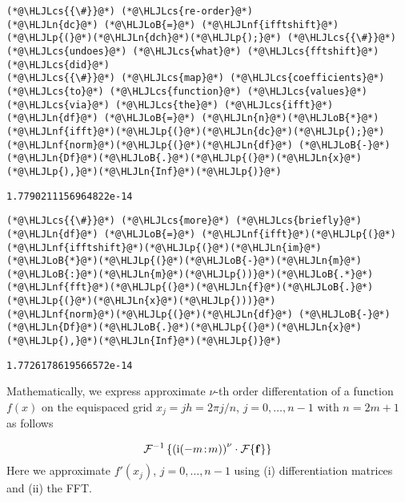 \documentclass[12pt,a4paper]{article}
\newcommand{\HLJLn}[1]{#1}
\newcommand{\HLJLnf}[1]{\textcolor[RGB]{66,102,213}{#1}}
\newcommand{\HLJLoB}[1]{\textcolor[RGB]{102,102,102}{\textbf{#1}}}
\newcommand{\HLJLp}[1]{#1}
\newcommand{\HLJLcs}[1]{\textcolor[RGB]{153,153,119}{\textit{#1}}}
\begin{document}
\begin{lstlisting}
(*@\HLJLcs{{\#}}@*) (*@\HLJLcs{re-order}@*)
(*@\HLJLn{dc}@*) (*@\HLJLoB{=}@*) (*@\HLJLnf{ifftshift}@*)(*@\HLJLp{(}@*)(*@\HLJLn{dch}@*)(*@\HLJLp{);}@*) (*@\HLJLcs{{\#}}@*) (*@\HLJLcs{undoes}@*) (*@\HLJLcs{what}@*) (*@\HLJLcs{fftshift}@*) (*@\HLJLcs{did}@*)
(*@\HLJLcs{{\#}}@*) (*@\HLJLcs{map}@*) (*@\HLJLcs{coefficients}@*) (*@\HLJLcs{to}@*) (*@\HLJLcs{function}@*) (*@\HLJLcs{values}@*) (*@\HLJLcs{via}@*) (*@\HLJLcs{the}@*) (*@\HLJLcs{ifft}@*)
(*@\HLJLn{df}@*) (*@\HLJLoB{=}@*) (*@\HLJLn{n}@*)(*@\HLJLoB{*}@*)(*@\HLJLnf{ifft}@*)(*@\HLJLp{(}@*)(*@\HLJLn{dc}@*)(*@\HLJLp{);}@*)
(*@\HLJLnf{norm}@*)(*@\HLJLp{(}@*)(*@\HLJLn{df}@*) (*@\HLJLoB{-}@*) (*@\HLJLn{Df}@*)(*@\HLJLoB{.}@*)(*@\HLJLp{(}@*)(*@\HLJLn{x}@*)(*@\HLJLp{),}@*)(*@\HLJLn{Inf}@*)(*@\HLJLp{)}@*)
\end{lstlisting}

\begin{lstlisting}
1.7790211156964822e-14
\end{lstlisting}


\begin{lstlisting}
(*@\HLJLcs{{\#}}@*) (*@\HLJLcs{more}@*) (*@\HLJLcs{briefly}@*)
(*@\HLJLn{df}@*) (*@\HLJLoB{=}@*) (*@\HLJLnf{ifft}@*)(*@\HLJLp{(}@*)(*@\HLJLnf{ifftshift}@*)(*@\HLJLp{(}@*)(*@\HLJLn{im}@*)(*@\HLJLoB{*}@*)(*@\HLJLp{(}@*)(*@\HLJLoB{-}@*)(*@\HLJLn{m}@*)(*@\HLJLoB{:}@*)(*@\HLJLn{m}@*)(*@\HLJLp{))}@*)(*@\HLJLoB{.*}@*)(*@\HLJLnf{fft}@*)(*@\HLJLp{(}@*)(*@\HLJLn{f}@*)(*@\HLJLoB{.}@*)(*@\HLJLp{(}@*)(*@\HLJLn{x}@*)(*@\HLJLp{)))}@*)
(*@\HLJLnf{norm}@*)(*@\HLJLp{(}@*)(*@\HLJLn{df}@*) (*@\HLJLoB{-}@*) (*@\HLJLn{Df}@*)(*@\HLJLoB{.}@*)(*@\HLJLp{(}@*)(*@\HLJLn{x}@*)(*@\HLJLp{),}@*)(*@\HLJLn{Inf}@*)(*@\HLJLp{)}@*)
\end{lstlisting}

\begin{lstlisting}
1.7726178619566572e-14
\end{lstlisting}


Mathematically, we express approximate $\nu$-th order differentation of a function $f(x)$ on the equispaced grid $x_j = jh = 2\pi j/n$, $j = 0, \ldots, n-1$ with $n = 2m + 1$ as follows

\[
\mathcal{F}^{-1}\left\lbrace\left({\rm i}(-m\!:\!m)\right)^{\nu}\cdot\mathcal{F}\lbrace \mathbf{f} \rbrace\right\rbrace
\]
Here we approximate $f'(x_j)$, $j = 0, \ldots, n-1$ using (i) differentiation matrices and (ii) the FFT.
\end{document}
